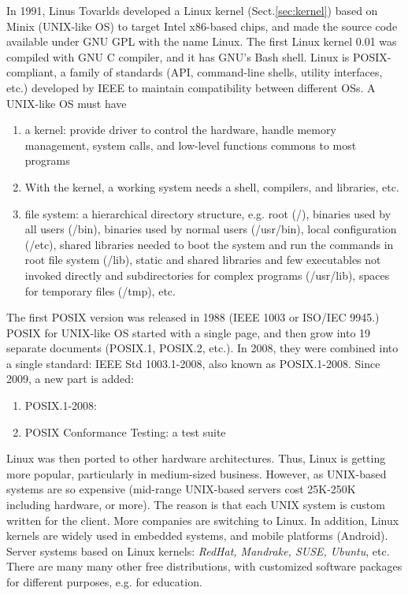 In 1991, Linus Tovarlds developed a Linux kernel (Sect.\ref{sec:kernel}) based
on Minix (UNIX-like OS) to target Intel x86-based chips, and made the source
code available under GNU GPL with the name Linux. The first Linux kernel 0.01
was compiled with GNU C compiler, and it has GNU's Bash shell. Linux is
POSIX-compliant, a family of standards (API, command-line shells, utility
interfaces, etc.) developed by IEEE to maintain compatibility between different
OSs. A UNIX-like OS must have
\begin{enumerate}
  \item a kernel: provide driver to control the hardware, handle memory
  management, system calls, and low-level functions commons to most programs
  \item With the kernel, a working system needs a shell, compilers, and libraries, etc.
  \item file system: a hierarchical directory structure, e.g. root (/), binaries
  used by all users (/bin), binaries used by normal users (/usr/bin), local
  configuration (/etc), shared libraries needed to boot the system and
  run the commands in root file system (/lib), static and shared libraries
  and few executables not invoked directly and subdirectories for complex
  programs (/usr/lib), spaces for temporary files (/tmp), etc.
\end{enumerate} 

The first POSIX version was released in 1988 (IEEE 1003 or ISO/IEC 9945.) POSIX
for UNIX-like OS started with a single page, and then grow into 19 separate
documents (POSIX.1, POSIX.2, etc.). In 2008, they were combined into a single
standard: IEEE Std 1003.1-2008, also known as POSIX.1-2008. Since 2009, a new
part is added:
\begin{enumerate}
  \item POSIX.1-2008: 
  \item POSIX Conformance Testing: a test suite 
\end{enumerate}

Linux was then ported to other hardware architectures. Thus, Linux is getting
more popular, particularly in medium-sized business.
However, as UNIX-based systems are so expensive (mid-range UNIX-based servers
cost 25K-250K including hardware, or more). The reason is that each UNIX system
is custom written for the client.
More companies are switching to Linux. In addition, Linux kernels are widely
used in embedded systems, and mobile platforms (Android). Server systems based
on Linux kernels: {\it RedHat, Mandrake, SUSE, Ubuntu}, etc. There are many many
other free distributions, with customized software packages for different
purposes, e.g. for education.

